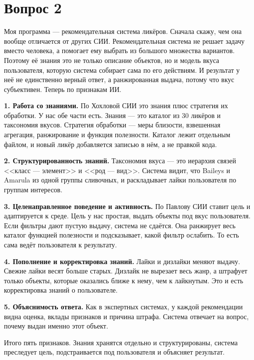\section*{Вопрос 2}

Моя программа --- рекомендательная система ликёров. Сначала скажу, чем она вообще отличается от других СИИ. Рекомендательная система не решает задачу вместо человека, а помогает ему выбрать из большого множества вариантов. Поэтому её знания это не только описание объектов, но и модель вкуса пользователя, которую система собирает сама по его действиям. И результат у неё не единственно верный ответ, а ранжированная выдача, потому что вкус субъективен. Теперь по признакам ИИ.

\textbf{1. Работа со знаниями.} По Хохловой СИИ это знания плюс стратегия их обработки. У нас обе части есть. Знания --- это каталог из 30 ликёров и таксономия вкусов. Стратегия обработки --- меры близости, взвешенная агрегация, ранжирование и функция полезности. Каталог лежит отдельным файлом, и новый ликёр добавляется записью в нём, а не правкой кода.

\textbf{2. Структурированность знаний.} Таксономия вкуса --- это иерархия связей <<класс --- элемент>> и <<род --- вид>>. Система видит, что Baileys и Amarula из одной группы сливочных, и раскладывает лайки пользователя по группам интересов.

\textbf{3. Целенаправленное поведение и активность.} По Павлову СИИ ставит цель и адаптируется к среде. Цель у нас простая, выдать объекты под вкус пользователя. Если фильтры дают пустую выдачу, система не сдаётся. Она ранжирует весь каталог функцией полезности и подсказывает, какой фильтр ослабить. То есть сама ведёт пользователя к результату.

\textbf{4. Пополнение и корректировка знаний.} Лайки и дизлайки меняют выдачу. Свежие лайки весят больше старых. Дизлайк не вырезает весь жанр, а штрафует только объекты, которые оказались ближе к нему, чем к лайкнутым. Это и есть корректировка знаний о пользователе.

\textbf{5. Объяснимость ответа.} Как в экспертных системах, у каждой рекомендации видна оценка, вклады признаков и причина штрафа. Система отвечает на вопрос, почему выдан именно этот объект.

Итого пять признаков. Знания хранятся отдельно и структурированы, система преследует цель, подстраивается под пользователя и объясняет результат.
